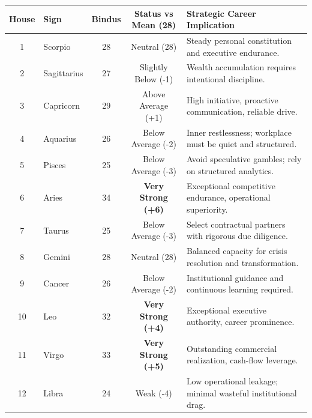
\begin{executivecard}
  \sffamily\fontsize{8}{11.5}\selectfont
  \begin{tabularx}{\linewidth}{@{}c l c c X@{}}
    \toprule
    \textbf{House} & \textbf{Sign} & \textbf{Bindus} & \textbf{Status vs Mean (28)} & \textbf{Strategic Career Implication} \\
    \midrule
    1 & Scorpio & 28 & Neutral (28) & Steady personal constitution and executive endurance. \\
    2 & Sagittarius & 27 & Slightly Below (-1) & Wealth accumulation requires intentional discipline. \\
    3 & Capricorn & 29 & Above Average (+1) & High initiative, proactive communication, reliable drive. \\
    4 & Aquarius & 26 & Below Average (-2) & Inner restlessness; workplace must be quiet and structured. \\
    5 & Pisces & 25 & Below Average (-3) & Avoid speculative gambles; rely on structured analytics. \\
    6 & Aries & 34 & \textbf{Very Strong (+6)} & Exceptional competitive endurance, operational superiority. \\
    7 & Taurus & 25 & Below Average (-3) & Select contractual partners with rigorous due diligence. \\
    8 & Gemini & 28 & Neutral (28) & Balanced capacity for crisis resolution and transformation. \\
    9 & Cancer & 26 & Below Average (-2) & Institutional guidance and continuous learning required. \\
    10 & Leo & 32 & \textbf{Very Strong (+4)} & Exceptional executive authority, career prominence. \\
    11 & Virgo & 33 & \textbf{Very Strong (+5)} & Outstanding commercial realization, cash-flow leverage. \\
    12 & Libra & 24 & Weak (-4) & Low operational leakage; minimal wasteful institutional drag. \\
    \bottomrule
  \end{tabularx}
\end{executivecard}\vspace{2mm}

